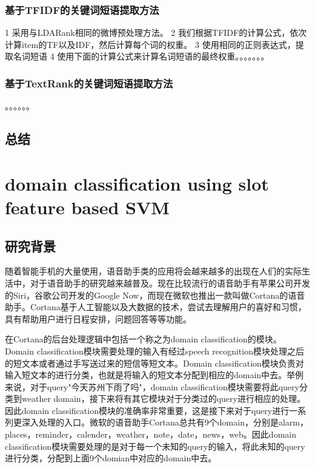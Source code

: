 \documentclass[master]{njuthesis}
\begin{document}
\subsection{基于TFIDF的关键词短语提取方法}

    1 采用与LDARank相同的微博预处理方法。
    2 我们根据TFIDF的计算公式，依次计算item的TF以及IDF，然后计算每个词的权重。
    3 使用相同的正则表达式，提取名词短语
    4 使用下面的计算公式来计算名词短语的最终权重。。。。。。。

\subsection{基于TextRank的关键词短语提取方法}
    。。。。。。

\section{总结}

\chapter{domain classification using slot feature based SVM}\label{chapter_smallworld}

\section{研究背景}

    随着智能手机的大量使用，语音助手类的应用将会越来越多的出现在人们的实际生活中，对于语音助手的研究越来越普及。现在比较流行的语音助手有苹果公司开发的Siri，谷歌公司开发的Google Now，而现在微软也推出一款叫做Cortana的语音助手。Cortana基于人工智能以及大数据的技术，尝试去理解用户的喜好和习惯，具有帮助用户进行日程安排，问题回答等等功能。

    在Cortana的后台处理逻辑中包括一个称之为domain classification的模块。Domain classification模块需要处理的输入有经过speech recognition模块处理之后的短文本或者通过手写送过来的短信等短文本。Domain classification模块负责对输入短文本的进行分类，也就是将输入的短文本分配到相应的domain中去。举例来说，对于query"今天苏州下雨了吗"，domain classification模块需要将此query分类到weather domain，接下来将有其它模块对于分类过的query进行相应的处理。因此domain classification模块的准确率非常重要，这是接下来对于query进行一系列更深入处理的入口。微软的语音助手Cortana总共有9个domain，分别是alarm，places，reminder，calender，weather，note，date，news，web。因此domain classification模块需要处理的是对于每一个未知的query的输入，将此未知的query进行分类，分配到上面9个domian中对应的domain中去。
\end{document}

